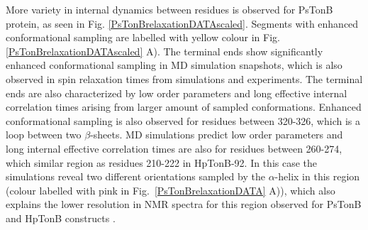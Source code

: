 \documentclass[pre,aps,floatfix,authordate1-4,twocolumn]{revtex4-1}
\begin{document}
More variety in internal dynamics between residues is observed for PsTonB protein,
as seen in Fig. \ref{PsTonBrelaxationDATAscaled}. Segments
with enhanced conformational sampling are labelled with yellow colour
in Fig. \ref{PsTonBrelaxationDATAscaled} A).
The terminal ends show significantly enhanced conformational sampling
in MD simulation snapshots, which is also observed in spin relaxation times
from simulations and experiments. The terminal ends are also characterized
by low order parameters and long effective internal correlation times
arising from larger amount of sampled conformations.
Enhanced conformational sampling is also observed for residues between 320-326,
which is a loop between two $\beta$-sheets.
MD simulations predict low order parameters and long internal effective correlation
times are also for residues between 260-274, which similar region
as residues 210-222 in HpTonB-92. In this case the simulations reveal
two different orientations sampled by the $\alpha$-helix in this region
(colour labelled with pink in Fig.~\ref{PsTonBrelaxationDATA} A)), which
also explains the lower resolution in NMR spectra for this region
observed for PsTonB and HpTonB constructs \cite{??}.
\end{document}
